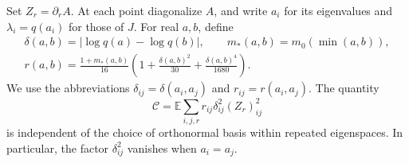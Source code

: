Set $Z_r=\partial_r A$.  At each point diagonalize $A$, and write
$a_i$ for its eigenvalues and $\lambda_i=q(a_i)$ for those of $J$.
For real $a,b$, define
\begin{equation}\label{tr:surplus-weight}
 \begin{gathered}
 \delta(a,b)=|\log q(a)-\log q(b)|,\qquad
 m_*(a,b)=m_0(\min(a,b)),\\
 r(a,b)=\frac{1+m_*(a,b)}{16}
    \left(1+\frac{\delta(a,b)^2}{30}
             +\frac{\delta(a,b)^4}{1680}\right).
 \end{gathered}
\end{equation}
We use the abbreviations $\delta_{ij}=\delta(a_i,a_j)$ and
$r_{ij}=r(a_i,a_j)$.  The quantity
\begin{equation}\label{tr:surplus-definition}
 \mathcal C=\mathbb E\sum_{i,j,r}
           r_{ij}\delta_{ij}^2(Z_r)_{ij}^2
\end{equation}
is independent of the choice of orthonormal basis within repeated
eigenspaces.  In particular, the factor $\delta_{ij}^2$ vanishes when
$a_i=a_j$.

